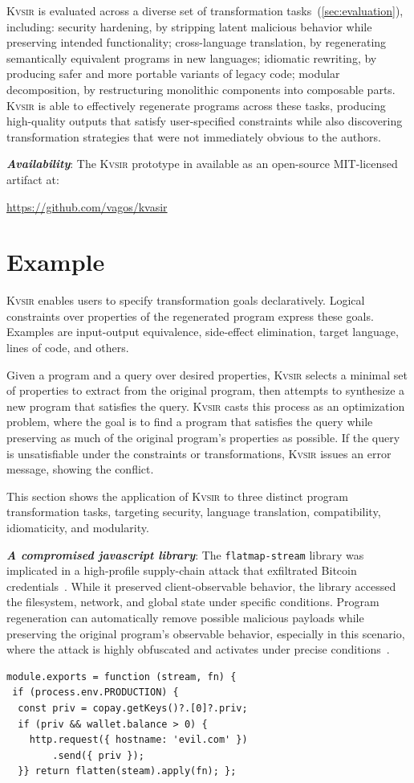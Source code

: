 \documentclass[nonacm,sigplan,review]{acmart}
\newcommand{\sys}{{\scshape Kv{\textalpha}sir}\xspace}
\newcommand{\heading}[1]{\vspace{2pt}\noindent\textbf{\emph{#1}}:\enspace}
\begin{document}
\sys is evaluated across a diverse set of transformation tasks~(\cref{sec:evaluation}), including:
	security hardening, by stripping latent malicious behavior while preserving intended functionality;
	cross-language translation, by regenerating semantically equivalent programs in new languages;
	idiomatic rewriting, by producing safer and more portable variants of legacy code;
	modular decomposition, by restructuring monolithic components into composable parts.
\sys is able to effectively regenerate programs across these tasks, producing high-quality outputs that satisfy user-specified constraints while also discovering transformation strategies that were not immediately obvious to the authors.

\heading{Availability}
The \sys prototype in available as an open-source MIT-licensed artifact at:
\begin{center}
  \url{https://github.com/vagos/kvasir}
\end{center}

\section{Example}
\label{sec:example}

\sys enables users to specify transformation goals declaratively.
Logical constraints over properties of the
regenerated program express these goals. Examples are input-output equivalence, side-effect elimination,
target language, lines of code, and others.

Given a program and a query over desired properties, \sys selects a minimal set
of properties to extract from the original program, then attempts to synthesize
a new program that satisfies the query.
\sys casts this process as an optimization problem, where the goal is to find a
program that satisfies the query while preserving as much of the original
program’s properties as possible.
If the query is unsatisfiable under
the constraints or transformations, \sys issues an error
message, showing the conflict.

This section shows the application of \sys
to three distinct program transformation tasks, 
targeting security, language translation, compatibility,
idiomaticity, and modularity.

\heading{A compromised javascript library}
The \texttt{flatmap-stream} library was implicated in a high-profile
supply-chain attack that exfiltrated Bitcoin credentials~\cite{ev:eurosec:2022}.
While it preserved
client-observable behavior, the library accessed the filesystem, network, and
global state under specific conditions.
Program regeneration can automatically remove possible malicious payloads
while preserving the original program's observable behavior,
especially in this scenario, where the attack is highly obfuscated and 
activates under precise conditions~\cite{harp:ccs:2021}.
\begin{verbatim}
module.exports = function (stream, fn) {
 if (process.env.PRODUCTION) {
  const priv = copay.getKeys()?.[0]?.priv;
  if (priv && wallet.balance > 0) {
    http.request({ hostname: 'evil.com' })
        .send({ priv });
  }} return flatten(steam).apply(fn); };
\end{verbatim}
\end{document}
